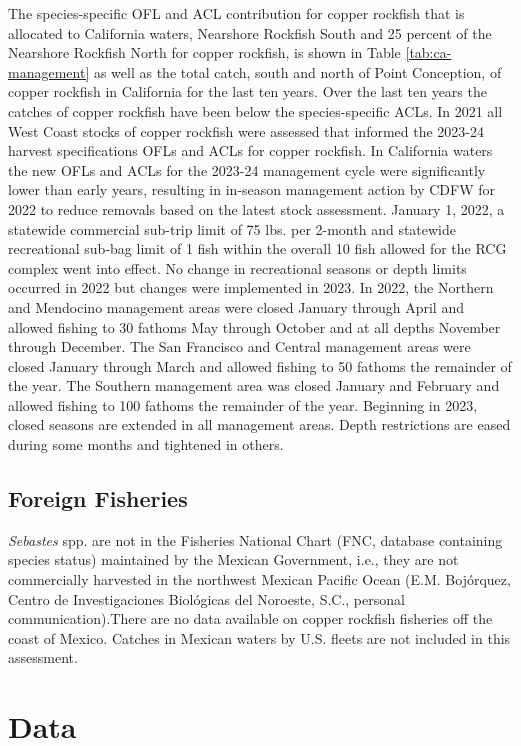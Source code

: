 \documentclass[11pt,
  english,
  letterpaper,
]{article}
\begin{document}
The species-specific OFL and ACL contribution for copper rockfish that is allocated to California waters, Nearshore Rockfish South and 25 percent of the Nearshore Rockfish North for copper rockfish, is shown in Table \ref{tab:ca-management} as well as the total catch, south and north of Point Conception, of copper rockfish in California for the last ten years. Over the last ten years the catches of copper rockfish have been below the species-specific ACLs. In 2021 all West Coast stocks of copper rockfish were assessed that informed the 2023-24 harvest specifications OFLs and ACLs for copper rockfish. In California waters the new OFLs and ACLs for the 2023-24 management cycle were significantly lower than early years, resulting in in-season management action by CDFW for 2022 to reduce removals based on the latest stock assessment. January 1, 2022, a statewide commercial sub-trip limit of 75 lbs. per 2-month and statewide recreational sub-bag limit of 1 fish within the overall 10 fish allowed for the RCG complex went into effect. No change in recreational seasons or depth limits occurred in 2022 but changes were implemented in 2023. In 2022, the Northern and Mendocino management areas were closed January through April and allowed fishing to 30 fathoms May through October and at all depths November through December. The San Francisco and Central management areas were closed January through March and allowed fishing to 50 fathoms the remainder of the year. The Southern management area was closed January and February and allowed fishing to 100 fathoms the remainder of the year. Beginning in 2023, closed seasons are extended in all management areas. Depth restrictions are eased during some months and tightened in others.

\hypertarget{foreign-fisheries}{%
\subsection{Foreign Fisheries}\label{foreign-fisheries}}

\emph{Sebastes} spp. are not in the Fisheries National Chart (FNC, database containing species status) maintained by the Mexican Government, i.e., they are not commercially harvested in the northwest Mexican Pacific Ocean (E.M. Bojórquez, Centro de Investigaciones Biológicas del Noroeste, S.C., personal communication).There are no data available on copper rockfish fisheries off the coast of Mexico. Catches in Mexican waters by U.S. fleets are not included in this assessment.

\hypertarget{data}{%
\section{Data}\label{data}}
\end{document}
